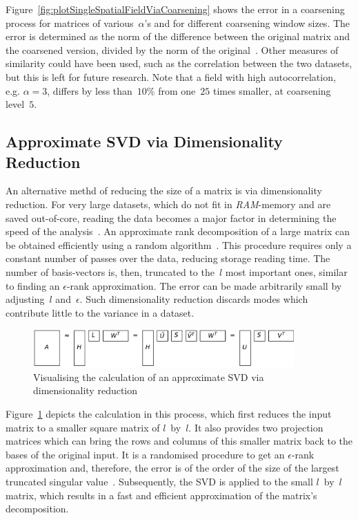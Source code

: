 \documentclass[ijgi,article,submit,moreauthors,pdftex,10pt,a4paper]{Definitions/mdpi}
\begin{document}
Figure~\ref{fig:plotSingleSpatialFieldViaCoarsening} shows the error in a coarsening process for matrices of various~$\alpha$'s and for different coarsening window sizes. The error is determined as the norm of the difference between the original matrix and the coarsened version, divided by the norm of the original~\cite{Bogaardt2018}. Other measures of similarity could have been used, such as the correlation between the two datasets, but this is left for future research. Note that a field with high autocorrelation, e.g. $\alpha=3$, differs by less than~$10\%$ from one~$25$ times smaller, at coarsening level~$5$.

\subsection{Approximate SVD via Dimensionality Reduction}
\label{sec:Results/Approximate SVD via Dimensionality Reduction}

An alternative methd of reducing the size of a matrix is via dimensionality reduction. For very large datasets, which do not fit in \textit{RAM}-memory and are saved out-of-core, reading the data becomes a major factor in determining the speed of the analysis~\cite{Halko2011}. An approximate rank decomposition of a large matrix can be obtained efficiently using a random algorithm~\cite{Halko2011, Li2016}. This procedure requires only a constant number of passes over the data, reducing storage reading time. The number of basis-vectors is, then, truncated to the~$l$ most important ones, similar to finding an $\epsilon$-rank approximation. The error can be made arbitrarily small by adjusting~$l$ and~$\epsilon$. Such dimensionality reduction discards modes which contribute little to the variance in a dataset.

\begin{figure}[H]
\centering
\includegraphics[width=100mm]{Results/reduceSizeRandomisedSquare.pdf}
\caption[Approximate randomised SVD]{Visualising the calculation of an approximate SVD via dimensionality reduction}
\label{fig:reduceSizeRandomisedSquare}
\end{figure}

Figure~\ref{fig:reduceSizeRandomisedSquare} depicts the calculation in this process, which first reduces the input matrix to a smaller square matrix of $l$~by~$l$. It also provides two projection matrices which can bring the rows and columns of this smaller matrix back to the bases of the original input. It is a randomised procedure to get an $\epsilon$-rank approximation and, therefore, the error is of the order of the size of the largest truncated singular value~\cite{Martinsson2016, Halko2011}. Subsequently, the SVD is applied to the small $l$~by~$l$ matrix, which results in a fast and efficient approximation of the matrix's decomposition.
\end{document}
